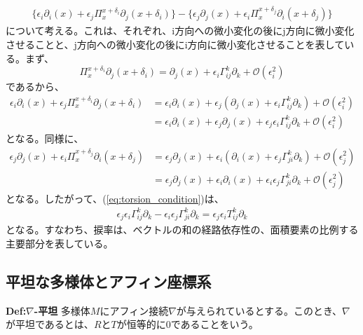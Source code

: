 \documentclass[a4paper,11pt]{jsarticle}
\numberwithin{equation}{section}
\begin{document}
\begin{align}
    \label{eq:torsion_condition}
    \{\epsilon_i \partial_{i}(x)+\epsilon_j\Pi_{x}^{x+\delta_i}\partial_{j}(x+\delta_i)\} - \{\epsilon_j \partial_{j}(x)+\epsilon_i\Pi_{x}^{x+\delta_j}\partial_{i}(x+\delta_j)\} 
\end{align}
について考える。これは、それぞれ、i方向への微小変化の後にj方向に微小変化させることと、j方向への微小変化の後にi方向に微小変化させることを表している。まず、
\begin{equation}
    \Pi_{x}^{x+\delta_i}\partial_{j}(x+\delta_i) = \partial_{j}(x)+\epsilon_i \Gamma_{ij}^k\partial_{k}+\mathcal{O}(\epsilon_i^2)
\end{equation}
であるから、
\begin{align}
    \epsilon_i \partial_{i}(x)+\epsilon_j\Pi_{x}^{x+\delta_i}\partial_{j}(x+\delta_i) &= \epsilon_i \partial_{i}(x)+\epsilon_j(\partial_{j}(x)+\epsilon_i \Gamma_{ij}^k\partial_{k})+\mathcal{O}(\epsilon_i^2)\\
    &= \epsilon_i \partial_{i}(x)+\epsilon_j\partial_{j}(x)+\epsilon_j\epsilon_i \Gamma_{ij}^k\partial_{k}+\mathcal{O}(\epsilon_i^2)
\end{align}
となる。同様に、
\begin{align}
    \epsilon_j \partial_{j}(x)+\epsilon_i\Pi_{x}^{x+\delta_j}\partial_{i}(x+\delta_j) &= \epsilon_j \partial_{j}(x)+\epsilon_i(\partial_{i}(x)+\epsilon_j \Gamma_{ji}^k\partial_{k})+\mathcal{O}(\epsilon_j^2)\\
    &= \epsilon_j \partial_{j}(x)+\epsilon_i\partial_{i}(x)+\epsilon_i\epsilon_j \Gamma_{ji}^k\partial_{k}+\mathcal{O}(\epsilon_j^2)
\end{align}
となる。したがって、(\ref{eq:torsion_condition})は、
\begin{align}
    \epsilon_j\epsilon_i \Gamma_{ij}^k\partial_{k} - \epsilon_i\epsilon_j \Gamma_{ji}^k\partial_{k}=\epsilon_j\epsilon_i T_{ij}^k\partial_{k}
\end{align}
となる。すなわち、捩率は、ベクトルの和の経路依存性の、面積要素の比例する主要部分を表している。\\

\subsection{平坦な多様体とアフィン座標系}
\begin{itembox}[l]{\textbf{Def:$\nabla$-平坦}}
    多様体$M$にアフィン接続$\nabla$が与えられているとする。このとき、$\nabla$が平坦であるとは、$R$と$T$が恒等的に0であることをいう。
\end{itembox}
\end{document}
